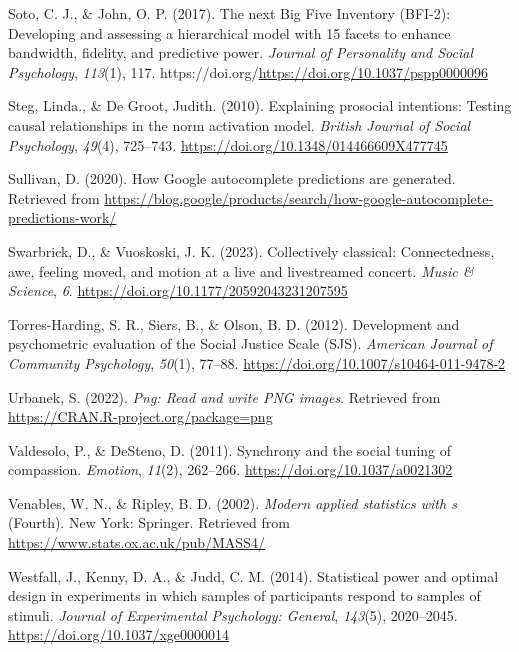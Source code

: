 \documentclass[
  man,floatsintext]{apa6}
\newlength{\cslhangindent}
\newenvironment{CSLReferences}[2] %
 {\begin{list}{}{%
  \setlength{\itemindent}{0pt}
  \setlength{\leftmargin}{0pt}
  \setlength{\parsep}{0pt}
  \ifodd #1
   \setlength{\leftmargin}{\cslhangindent}
   \setlength{\itemindent}{-1\cslhangindent}
  \fi
  \setlength{\itemsep}{#2\baselineskip}}}
 {\end{list}}
\begin{document}
\begin{CSLReferences}{1}{0}
Soto, C. J., \& John, O. P. (2017). The next {Big} {Five} {Inventory} ({BFI}-2): {Developing} and assessing a hierarchical model with 15 facets to enhance bandwidth, fidelity, and predictive power. \emph{Journal of Personality and Social Psychology}, \emph{113}(1), 117. https://doi.org/\url{https://doi.org/10.1037/pspp0000096}

Steg, Linda., \& De Groot, Judith. (2010). Explaining prosocial intentions: {Testing} causal relationships in the norm activation model. \emph{British Journal of Social Psychology}, \emph{49}(4), 725--743. \url{https://doi.org/10.1348/014466609X477745}

Sullivan, D. (2020). How {Google} autocomplete predictions are generated. Retrieved from \url{https://blog.google/products/search/how-google-autocomplete-predictions-work/}

Swarbrick, D., \& Vuoskoski, J. K. (2023). Collectively classical: {Connectedness}, awe, feeling moved, and motion at a live and livestreamed concert. \emph{Music \& Science}, \emph{6}. \url{https://doi.org/10.1177/20592043231207595}

Torres-Harding, S. R., Siers, B., \& Olson, B. D. (2012). Development and psychometric evaluation of the {Social} {Justice} {Scale} ({SJS}). \emph{American Journal of Community Psychology}, \emph{50}(1), 77--88. \url{https://doi.org/10.1007/s10464-011-9478-2}

Urbanek, S. (2022). \emph{Png: Read and write PNG images}. Retrieved from \url{https://CRAN.R-project.org/package=png}

Valdesolo, P., \& DeSteno, D. (2011). Synchrony and the social tuning of compassion. \emph{Emotion}, \emph{11}(2), 262--266. \url{https://doi.org/10.1037/a0021302}

Venables, W. N., \& Ripley, B. D. (2002). \emph{Modern applied statistics with s} (Fourth). New York: Springer. Retrieved from \url{https://www.stats.ox.ac.uk/pub/MASS4/}

Westfall, J., Kenny, D. A., \& Judd, C. M. (2014). Statistical power and optimal design in experiments in which samples of participants respond to samples of stimuli. \emph{Journal of Experimental Psychology: General}, \emph{143}(5), 2020--2045. \url{https://doi.org/10.1037/xge0000014}


\end{CSLReferences}
\end{document}
